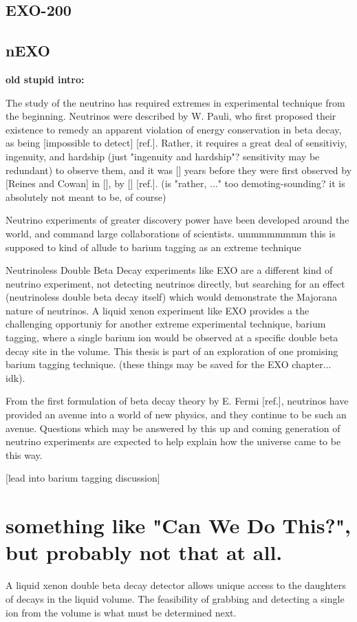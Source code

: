 \subsection{EXO-200}



\subsection{nEXO}

\noindent
{\color{gray}\textbf{old stupid intro:}

The study of the neutrino has required extremes in experimental technique from the beginning.  Neutrinos were described by W. Pauli, who first proposed their existence to remedy an apparent violation of energy conservation in beta decay, as being [impossible to detect] [ref.].  Rather, it requires a great deal of sensitiviy, ingenuity, and hardship (just "ingenuity and hardship"?  sensitivity may be redundant) to observe them, and it was [] years before they were first observed by [Reines and Cowan] in [], by [] [ref.].  (is "rather, ..." too demoting-sounding?  it is absolutely not meant to be, of course)

Neutrino experiments of greater discovery power have been developed around the world, and command large collaborations of scientists.  ummmmmmmm  this is supposed to kind of allude to barium tagging as an extreme technique

Neutrinoless Double Beta Decay experiments like EXO are a different kind of neutrino experiment, not detecting neutrinos directly, but searching for an effect (neutrinoless double beta decay itself) which would demonstrate the Majorana nature of neutrinos.  A liquid xenon experiment like EXO provides a the challenging opportuniy for another extreme experimental technique, barium tagging, where a single barium ion would be observed at a specific double beta decay site in the volume.  This thesis is part of an exploration of one promising barium tagging technique.  (these things may be saved for the EXO chapter... idk).

From the first formulation of beta decay theory by E. Fermi [ref.], neutrinos have provided an avenue into a world of new physics, and they continue to be such an avenue.  Questions which may be answered by this up and coming generation of neutrino experiments are expected to help explain how the universe came to be this way.

[lead into barium tagging discussion]

\section{something like "Can We Do This?", but probably not that at all.}

A liquid xenon double beta decay detector allows unique access to the daughters of decays in the liquid volume.  The feasibility of grabbing and detecting a single ion from the volume is what must be determined next.}